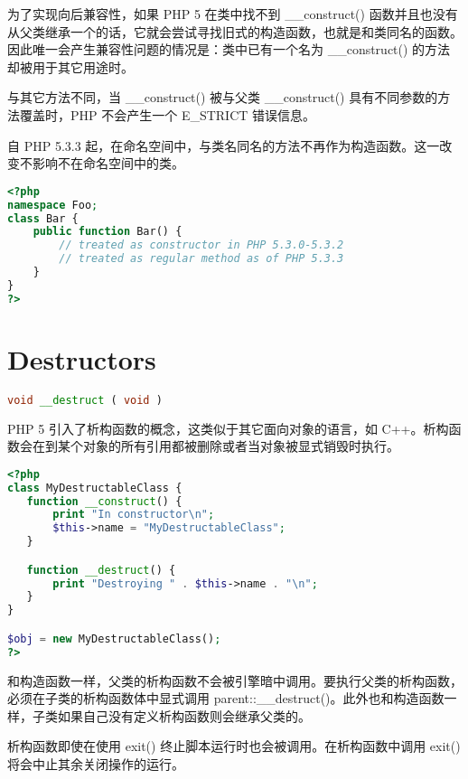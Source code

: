 为了实现向后兼容性，如果 PHP 5 在类中找不到 \_\_construct() 函数并且也没有从父类继承一个的话，它就会尝试寻找旧式的构造函数，也就是和类同名的函数。因此唯一会产生兼容性问题的情况是：类中已有一个名为 \_\_construct() 的方法却被用于其它用途时。

与其它方法不同，当 \_\_construct() 被与父类 \_\_construct() 具有不同参数的方法覆盖时，PHP 不会产生一个 E\_STRICT 错误信息。

自 PHP 5.3.3 起，在命名空间中，与类名同名的方法不再作为构造函数。这一改变不影响不在命名空间中的类。

\begin{lstlisting}[language=PHP]
<?php
namespace Foo;
class Bar {
    public function Bar() {
        // treated as constructor in PHP 5.3.0-5.3.2
        // treated as regular method as of PHP 5.3.3
    }
}
?>
\end{lstlisting}



\section{Destructors}









\begin{lstlisting}[language=PHP]
void __destruct ( void )
\end{lstlisting}

PHP 5 引入了析构函数的概念，这类似于其它面向对象的语言，如 C++。析构函数会在到某个对象的所有引用都被删除或者当对象被显式销毁时执行。


\begin{lstlisting}[language=PHP]
<?php
class MyDestructableClass {
   function __construct() {
       print "In constructor\n";
       $this->name = "MyDestructableClass";
   }

   function __destruct() {
       print "Destroying " . $this->name . "\n";
   }
}

$obj = new MyDestructableClass();
?>
\end{lstlisting}


和构造函数一样，父类的析构函数不会被引擎暗中调用。要执行父类的析构函数，必须在子类的析构函数体中显式调用 parent::\_\_destruct()。此外也和构造函数一样，子类如果自己没有定义析构函数则会继承父类的。

析构函数即使在使用 exit() 终止脚本运行时也会被调用。在析构函数中调用 exit() 将会中止其余关闭操作的运行。

